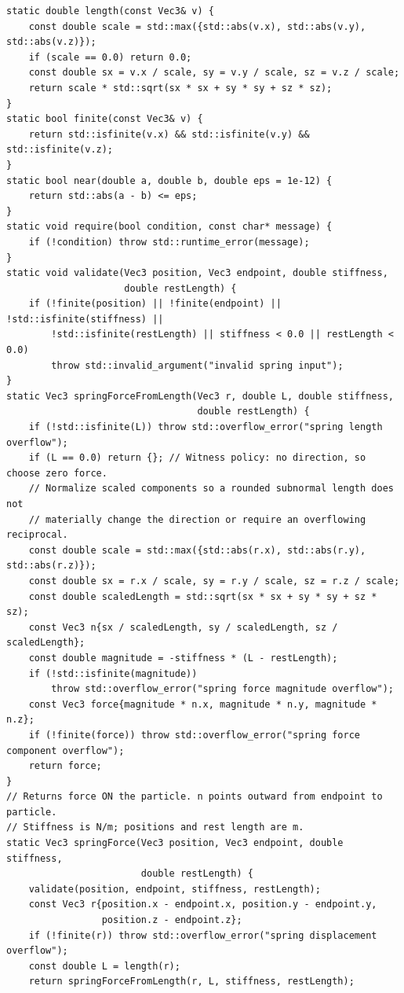 \begin{verbatim}
static double length(const Vec3& v) {
    const double scale = std::max({std::abs(v.x), std::abs(v.y), std::abs(v.z)});
    if (scale == 0.0) return 0.0;
    const double sx = v.x / scale, sy = v.y / scale, sz = v.z / scale;
    return scale * std::sqrt(sx * sx + sy * sy + sz * sz);
}
static bool finite(const Vec3& v) {
    return std::isfinite(v.x) && std::isfinite(v.y) && std::isfinite(v.z);
}
static bool near(double a, double b, double eps = 1e-12) {
    return std::abs(a - b) <= eps;
}
static void require(bool condition, const char* message) {
    if (!condition) throw std::runtime_error(message);
}
static void validate(Vec3 position, Vec3 endpoint, double stiffness,
                     double restLength) {
    if (!finite(position) || !finite(endpoint) || !std::isfinite(stiffness) ||
        !std::isfinite(restLength) || stiffness < 0.0 || restLength < 0.0)
        throw std::invalid_argument("invalid spring input");
}
static Vec3 springForceFromLength(Vec3 r, double L, double stiffness,
                                  double restLength) {
    if (!std::isfinite(L)) throw std::overflow_error("spring length overflow");
    if (L == 0.0) return {}; // Witness policy: no direction, so choose zero force.
    // Normalize scaled components so a rounded subnormal length does not
    // materially change the direction or require an overflowing reciprocal.
    const double scale = std::max({std::abs(r.x), std::abs(r.y), std::abs(r.z)});
    const double sx = r.x / scale, sy = r.y / scale, sz = r.z / scale;
    const double scaledLength = std::sqrt(sx * sx + sy * sy + sz * sz);
    const Vec3 n{sx / scaledLength, sy / scaledLength, sz / scaledLength};
    const double magnitude = -stiffness * (L - restLength);
    if (!std::isfinite(magnitude))
        throw std::overflow_error("spring force magnitude overflow");
    const Vec3 force{magnitude * n.x, magnitude * n.y, magnitude * n.z};
    if (!finite(force)) throw std::overflow_error("spring force component overflow");
    return force;
}
// Returns force ON the particle. n points outward from endpoint to particle.
// Stiffness is N/m; positions and rest length are m.
static Vec3 springForce(Vec3 position, Vec3 endpoint, double stiffness,
                        double restLength) {
    validate(position, endpoint, stiffness, restLength);
    const Vec3 r{position.x - endpoint.x, position.y - endpoint.y,
                 position.z - endpoint.z};
    if (!finite(r)) throw std::overflow_error("spring displacement overflow");
    const double L = length(r);
    return springForceFromLength(r, L, stiffness, restLength);

\end{verbatim}
